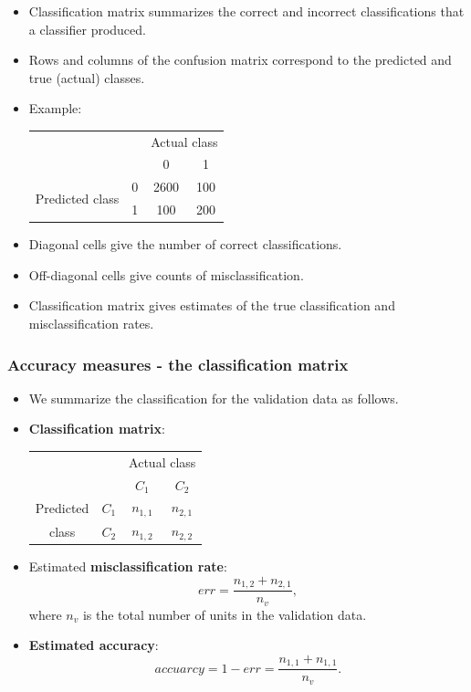 \documentclass[compress]{beamer}
\begin{document}
\begin{frame}
	\frametitle{}
	\begin{itemize}
  \item Classification matrix summarizes the correct and incorrect classifications
that a classifier produced.
  \item Rows and columns
of the confusion matrix correspond to the predicted and true (actual) classes.
\item Example:\\[-2mm]
\begin{tabular}{cccc}

 &  & \multicolumn{2}{|l}{Actual class} \\
  & & \multicolumn{1}{|c}{0} & 1 \\\hline
\multirow{2}{*}{Predicted class} & 0 & \multicolumn{1}{|c}{2600} & 100 \\
 & 1 & \multicolumn{1}{|c}{100} & 200 \\
\end{tabular}
\item Diagonal cells give the number of
correct classifications.
\item Off-diagonal cells give counts of misclassification.
\item Classification matrix gives estimates of the true classification and misclassification
rates.
\end{itemize}
\end{frame}



\begin{frame}
\frametitle{Accuracy measures - the classification matrix}
\begin{itemize}
\item We summarize the classification for the validation data as follows.
\item \textbf{Classification matrix}:\\[-2mm]
\begin{center}
\begin{tabular}{cccc}

 &  & \multicolumn{2}{|l}{Actual class} \\
  & & \multicolumn{1}{|c}{$C_1$} & $C_2$ \\\hline
\multirow{1}{*}{Predicted} & $C_1$ & \multicolumn{1}{|c}{$n_{1,1}$} & $n_{2,1}$\\
class & $C_2$ & \multicolumn{1}{|c}{$n_{1,2}$} & $n_{2,2}$ \\
\end{tabular}
\end{center}
\item Estimated \textbf{misclassification rate}: $$err=\frac{n_{1,2}+n_{2,1}}{n_v},$$ where $n_v$ is the total number of units in the validation data.
\item \textbf{Estimated accuracy}: $$accuarcy = 1- err=\frac{n_{1,1}+n_{1,1}}{n_v}.$$
\end{itemize}
\end{frame}
\end{document}
